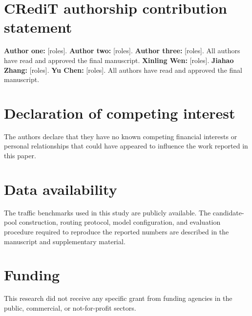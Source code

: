 \documentclass[\classoption,12pt]{elsarticle}
\theoremstyle{definition}
\begin{document}









\section*{CRediT authorship contribution statement}
\ifdefined\anonymousmode
\textbf{Author one:} [roles]. \textbf{Author two:} [roles].
\textbf{Author three:} [roles]. All authors have read and approved the final
manuscript.
\else
\textbf{Xinling Wen:} [roles]. \textbf{Jiahao Zhang:} [roles].
\textbf{Yu Chen:} [roles]. All authors have read and approved the final
manuscript.
\fi

\section*{Declaration of competing interest}
The authors declare that they have no known competing financial interests or
personal relationships that could have appeared to influence the work
reported in this paper.

\section*{Data availability}
The traffic benchmarks used in this study are publicly available. The
candidate-pool construction, routing protocol, model configuration, and
evaluation procedure required to reproduce the reported numbers are described
in the manuscript and supplementary material.

\section*{Funding}
This research did not receive any specific grant from funding agencies in the
public, commercial, or not-for-profit sectors.

% 



\end{document}
